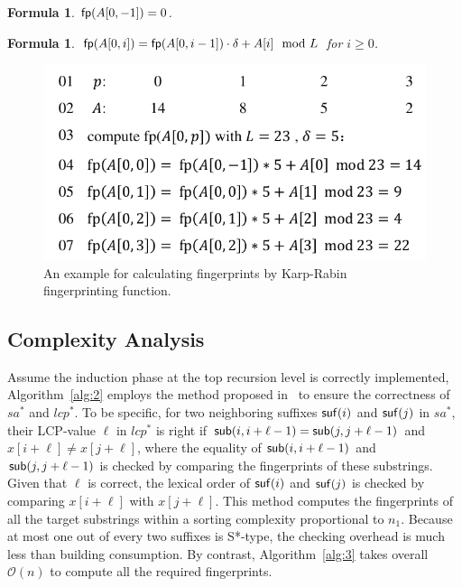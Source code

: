 \documentclass[10pt,journal,compsoc]{IEEEtran}
\newtheorem{formula}[theorem]{Formula}
\begin{document}
\begin{formula} \label{formula:1}${\sf fp}(A[0, -1]) = 0$.
\end{formula}

\begin{formula} \label{formula:2}${\sf fp}(A[0, i]) = {\sf fp}(A[0, i - 1]) \cdot {\delta} + A[i]\mod L$ for $i \ge 0$.
\end{formula}

\begin{figure}[htbp!]
	\centering
	
	\includegraphics[width = 1\columnwidth]{example2.pdf}
	
	\caption{An example for calculating fingerprints by Karp-Rabin fingerprinting function.}
	
	\label{fig:example2}
	
\end{figure}

\subsection{Complexity Analysis}

Assume the induction phase at the top recursion level is correctly implemented, Algorithm~\ref{alg:2} employs the method proposed in~\cite{wu2017} to ensure the correctness of $sa^*$ and $lcp^*$. To be specific, for two neighboring suffixes ${\sf suf}(i)$ and ${\sf suf}(j)$ in $sa^*$, their LCP-value $\ell$ in $lcp^*$ is right if ${\sf sub}(i, i + \ell - 1) = {\sf sub}(j, j + \ell - 1)$ and $x[i + \ell] \ne x[j + \ell]$, where the equality of ${\sf sub}(i, i + \ell - 1)$ and ${\sf sub}(j, j + \ell - 1)$ is checked by comparing the fingerprints of these substrings. Given that $\ell$ is correct, the lexical order of ${\sf suf}(i)$ and ${\sf suf}(j)$ is checked by comparing $x[i + \ell]$ with $x[j + \ell]$. This method computes the fingerprints of all the target substrings within a sorting complexity proportional to $n_1$. Because at most one out of every two suffixes is S*-type, the checking overhead is much less than building consumption. By contrast, Algorithm~\ref{alg:3} takes overall $\mathcal{O}(n)$ to compute all the required fingerprints.
\end{document}
